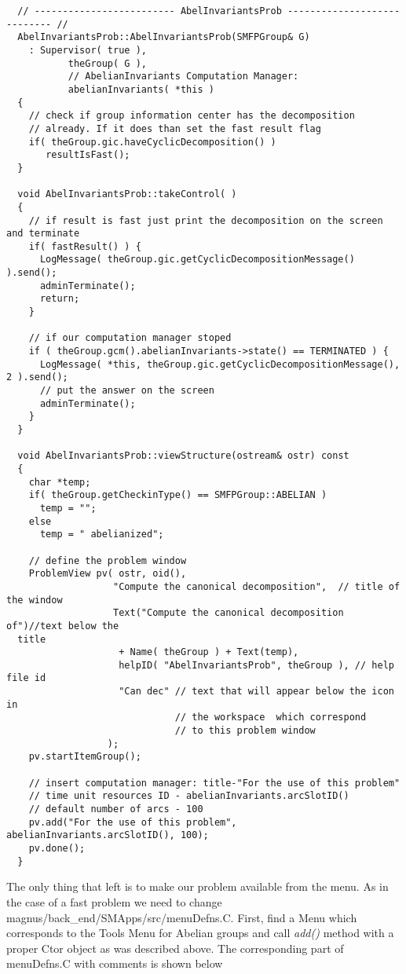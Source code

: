 \documentclass[12pt]{article}
\begin{document}
  \scriptsize
  \begin{verbatim}
  // ------------------------- AbelInvariantsProb ---------------------------- //
  AbelInvariantsProb::AbelInvariantsProb(SMFPGroup& G)
    : Supervisor( true ),
           theGroup( G ),
           // AbelianInvariants Computation Manager:
           abelianInvariants( *this )  
  {
    // check if group information center has the decomposition
    // already. If it does than set the fast result flag
    if( theGroup.gic.haveCyclicDecomposition() )  
       resultIsFast();                             
  }

  void AbelInvariantsProb::takeControl( )
  {
    // if result is fast just print the decomposition on the screen and terminate
    if( fastResult() ) {   
      LogMessage( theGroup.gic.getCyclicDecompositionMessage() ).send();
      adminTerminate();
      return;
    }

    // if our computation manager stoped
    if ( theGroup.gcm().abelianInvariants->state() == TERMINATED ) { 
      LogMessage( *this, theGroup.gic.getCyclicDecompositionMessage(), 2 ).send(); 
      // put the answer on the screen
      adminTerminate();
    }
  }

  void AbelInvariantsProb::viewStructure(ostream& ostr) const
  {
    char *temp;
    if( theGroup.getCheckinType() == SMFPGroup::ABELIAN )
      temp = "";
    else 
      temp = " abelianized";
      
    // define the problem window
    ProblemView pv( ostr, oid(), 
                   "Compute the canonical decomposition",  // title of the window
                   Text("Compute the canonical decomposition of")//text below the 
  title
                    + Name( theGroup ) + Text(temp),
                    helpID( "AbelInvariantsProb", theGroup ), // help file id
                    "Can dec" // text that will appear below the icon in
                              // the workspace  which correspond
                              // to this problem window
                  );                    
    pv.startItemGroup();  

    // insert computation manager: title-"For the use of this problem"
    // time unit resources ID - abelianInvariants.arcSlotID()
    // default number of arcs - 100
    pv.add("For the use of this problem", abelianInvariants.arcSlotID(), 100); 
    pv.done();
  }

  \end{verbatim}
  \normalsize

  The  only thing that left is to  make  our problem available from the menu.  
  As in the case of a fast problem  we need to change  
  magnus/back\_end/SMApps/src/menuDefns.C.
  First, find a Menu which corresponds to the Tools Menu for Abelian
  groups and call \emph{add()} method with a proper Ctor object as was described 
  above.
  The corresponding part of menuDefns.C with comments  is shown below
\end{document}
